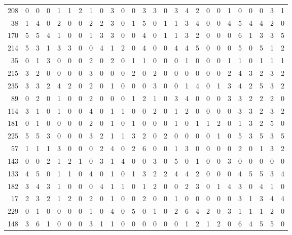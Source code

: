 \begin{longtable}{@{\extracolsep{\fill}}rccccccccccccccccccccccccc@{}}
208 & 0 & 0 & 0 & 1 & 1 & 2 & 1 & 0 & 3 & 0 & 0 & 3 & 3 & 0 & 3 & 4 & 2 & 0 & 0 & 1 & 0 & 0 & 0 & 3 & 1 \\
38 & 1 & 4 & 0 & 2 & 0 & 0 & 2 & 2 & 3 & 0 & 1 & 5 & 0 & 1 & 1 & 3 & 4 & 0 & 0 & 4 & 5 & 4 & 4 & 2 & 0 \\
170 & 5 & 5 & 4 & 1 & 0 & 0 & 1 & 3 & 3 & 0 & 0 & 4 & 0 & 1 & 1 & 3 & 2 & 0 & 0 & 0 & 6 & 1 & 3 & 3 & 5 \\
214 & 5 & 3 & 1 & 3 & 3 & 0 & 0 & 4 & 1 & 2 & 0 & 4 & 0 & 0 & 4 & 4 & 5 & 0 & 0 & 0 & 5 & 0 & 5 & 1 & 2 \\
35 & 0 & 1 & 3 & 0 & 0 & 0 & 2 & 0 & 2 & 0 & 1 & 1 & 0 & 0 & 0 & 1 & 0 & 0 & 0 & 1 & 1 & 0 & 1 & 1 & 1 \\
215 & 3 & 2 & 0 & 0 & 0 & 0 & 3 & 0 & 0 & 0 & 2 & 0 & 2 & 0 & 0 & 0 & 0 & 0 & 0 & 2 & 4 & 3 & 2 & 3 & 2 \\
235 & 3 & 3 & 2 & 4 & 2 & 0 & 2 & 0 & 1 & 0 & 0 & 0 & 3 & 0 & 0 & 1 & 4 & 0 & 1 & 3 & 4 & 2 & 5 & 3 & 2 \\
89 & 0 & 2 & 0 & 1 & 0 & 0 & 2 & 0 & 0 & 0 & 1 & 2 & 1 & 0 & 3 & 4 & 0 & 0 & 0 & 3 & 3 & 2 & 2 & 2 & 0 \\
114 & 3 & 1 & 0 & 1 & 0 & 0 & 4 & 0 & 1 & 1 & 0 & 0 & 2 & 0 & 1 & 2 & 0 & 0 & 0 & 0 & 3 & 3 & 2 & 3 & 2 \\
181 & 0 & 1 & 0 & 0 & 0 & 0 & 2 & 0 & 1 & 0 & 1 & 0 & 0 & 0 & 1 & 0 & 1 & 1 & 2 & 0 & 1 & 3 & 2 & 5 & 0 \\
225 & 5 & 5 & 3 & 0 & 0 & 0 & 3 & 2 & 1 & 1 & 3 & 2 & 0 & 2 & 0 & 0 & 0 & 0 & 1 & 0 & 5 & 3 & 5 & 3 & 5 \\
57 & 1 & 1 & 1 & 3 & 0 & 0 & 0 & 2 & 4 & 0 & 2 & 6 & 0 & 0 & 1 & 3 & 0 & 0 & 0 & 0 & 2 & 0 & 1 & 3 & 2 \\
143 & 0 & 0 & 2 & 1 & 2 & 1 & 0 & 3 & 1 & 4 & 0 & 0 & 3 & 0 & 5 & 0 & 1 & 0 & 0 & 3 & 0 & 0 & 0 & 0 & 0 \\
133 & 4 & 5 & 0 & 1 & 1 & 0 & 4 & 0 & 1 & 0 & 1 & 3 & 2 & 2 & 4 & 4 & 2 & 0 & 0 & 0 & 4 & 5 & 5 & 3 & 4 \\
182 & 3 & 4 & 3 & 1 & 0 & 0 & 0 & 4 & 1 & 1 & 0 & 1 & 2 & 0 & 0 & 2 & 3 & 0 & 1 & 4 & 3 & 0 & 4 & 1 & 0 \\
17 & 2 & 3 & 2 & 1 & 2 & 0 & 2 & 0 & 1 & 0 & 0 & 2 & 0 & 0 & 1 & 0 & 0 & 0 & 0 & 0 & 3 & 1 & 3 & 4 & 4 \\
229 & 0 & 1 & 0 & 0 & 0 & 0 & 1 & 0 & 4 & 0 & 5 & 0 & 1 & 0 & 2 & 6 & 4 & 2 & 0 & 3 & 1 & 1 & 1 & 2 & 0 \\
148 & 3 & 6 & 1 & 0 & 0 & 0 & 3 & 1 & 1 & 0 & 0 & 0 & 0 & 0 & 0 & 1 & 2 & 1 & 2 & 0 & 6 & 4 & 5 & 5 & 0 \\

\end{longtable}
